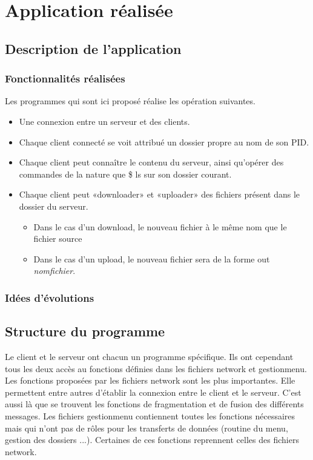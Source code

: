 \chapter{Application réalisée}
\section{Description de l'application}
\subsection{Fonctionnalités réalisées}
Les programmes qui sont ici proposé réalise les opération suivantes.
\begin{itemize}
	\item{}
	Une connexion entre un serveur et des clients.
	\item{}
	Chaque client connecté se voit attribué un dossier propre au nom de son PID.
	\item{}
	Chaque client peut connaître le contenu du serveur, ainsi qu'opérer des commandes de la nature que \$ ls sur son dossier courant.
	\item{}
	Chaque client peut «downloader» et «uploader» des fichiers présent dans le dossier du serveur.
	\begin{itemize}
		\item{}
		Dans le cas d'un download, le nouveau fichier à le même nom que le fichier source
		\item{}
		Dans le cas d'un upload, le nouveau fichier sera de la forme out \textit{nomfichier}.		
	 \end{itemize}
\end{itemize}
\subsection{Idées d'évolutions}

\section{Structure du programme}
Le client et le serveur ont chacun un programme spécifique. Ils ont cependant tous les deux accès au fonctions définies dans les fichiers network et gestionmenu. Les fonctions proposées par les fichiers network sont les plus importantes. Elle permettent entre autres d'établir la connexion entre le client et le serveur. C'est aussi là que se trouvent les fonctions de fragmentation et de fusion des différents messages.
Les fichiers gestionmenu contiennent toutes les fonctions nécessaires mais qui n'ont pas de rôles pour les transferts de données (routine du menu, gestion des dossiers ...). Certaines de ces fonctions reprennent celles des fichiers network.  


\clearpage

